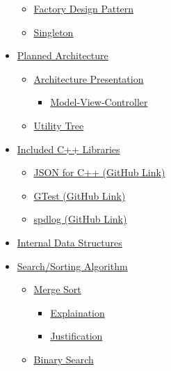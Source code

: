 \documentclass[
  english,
  a4paper,
,tablecaptionabove
]{scrartcl}
\providecommand{\tightlist}{%
  \setlength{\itemsep}{0pt}\setlength{\parskip}{0pt}}
\begin{document}
\begin{itemize}
  \begin{itemize}
  \tightlist
  \item
    \protect\hyperlink{factory-design-pattern}{Factory Design Pattern}
  \item
    \protect\hyperlink{singleton}{Singleton}
  \end{itemize}
\item
  \protect\hyperlink{planned-architecture}{Planned Architecture}

  \begin{itemize}
  \tightlist
  \item
    \protect\hyperlink{architecture-presentation}{Architecture
    Presentation}

    \begin{itemize}
    \tightlist
    \item
      \protect\hyperlink{model-view-controller}{Model-View-Controller}
    \end{itemize}
  \item
    \protect\hyperlink{utility-tree}{Utility Tree}
  \end{itemize}
\item
  \protect\hyperlink{included-c-libraries}{Included C++ Libraries}

  \begin{itemize}
  \tightlist
  \item
    \protect\hyperlink{json-for-c-github-link}{JSON for C++ (GitHub
    Link)}
  \item
    \protect\hyperlink{gtest-github-link}{GTest (GitHub Link)}
  \item
    \protect\hyperlink{spdlog-github-link}{spdlog (GitHub Link)}
  \end{itemize}
\item
  \protect\hyperlink{internal-data-structures}{Internal Data Structures}
\item
  \protect\hyperlink{searchsorting-algorithm}{Search/Sorting Algorithm}

  \begin{itemize}
  \tightlist
  \item
    \protect\hyperlink{merge-sort}{Merge Sort}

    \begin{itemize}
    \tightlist
    \item
      \protect\hyperlink{explaination}{Explaination}
    \item
      \protect\hyperlink{justification}{Justification}
    \end{itemize}
  \item
    \protect\hyperlink{binary-search}{Binary Search}


\end{itemize}
\end{itemize}
\end{document}
